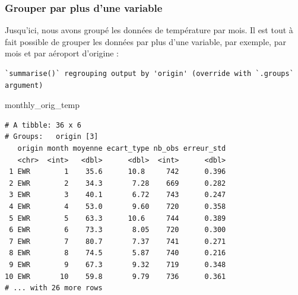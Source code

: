 \documentclass[
  a4paper,
]{article}
\newenvironment{Shaded}{\begin{snugshade}}{\end{snugshade}}
\newcommand{\DataTypeTok}[1]{\textcolor[rgb]{0.00,0.34,0.68}{#1}}
\newcommand{\KeywordTok}[1]{\textcolor[rgb]{0.12,0.11,0.11}{\textbf{#1}}}
\newcommand{\NormalTok}[1]{\textcolor[rgb]{0.12,0.11,0.11}{#1}}
\newcommand{\OperatorTok}[1]{\textcolor[rgb]{0.12,0.11,0.11}{#1}}
\newcommand{\OtherTok}[1]{\textcolor[rgb]{0.00,0.43,0.16}{#1}}
\newcommand{\StringTok}[1]{\textcolor[rgb]{0.75,0.01,0.01}{#1}}
\begin{document}
\hypertarget{grouper-par-plus-dune-variable}{%
\subsubsection{Grouper par plus d'une variable}\label{grouper-par-plus-dune-variable}}

Jusqu'ici, nous avons groupé les données de température par mois. Il est tout à fait possible de grouper les données par plus d'une variable, par exemple, par mois et par aéroport d'origine :

\begin{Shaded}
\end{Shaded}

\begin{verbatim}
`summarise()` regrouping output by 'origin' (override with `.groups` argument)
\end{verbatim}

\begin{Shaded}
\begin{Highlighting}[]
\NormalTok{monthly_orig_temp}
\end{Highlighting}
\end{Shaded}

\begin{verbatim}
# A tibble: 36 x 6
# Groups:   origin [3]
   origin month moyenne ecart_type nb_obs erreur_std
   <chr>  <int>   <dbl>      <dbl>  <int>      <dbl>
 1 EWR        1    35.6      10.8     742      0.396
 2 EWR        2    34.3       7.28    669      0.282
 3 EWR        3    40.1       6.72    743      0.247
 4 EWR        4    53.0       9.60    720      0.358
 5 EWR        5    63.3      10.6     744      0.389
 6 EWR        6    73.3       8.05    720      0.300
 7 EWR        7    80.7       7.37    741      0.271
 8 EWR        8    74.5       5.87    740      0.216
 9 EWR        9    67.3       9.32    719      0.348
10 EWR       10    59.8       9.79    736      0.361
# ... with 26 more rows
\end{verbatim}
\end{document}
